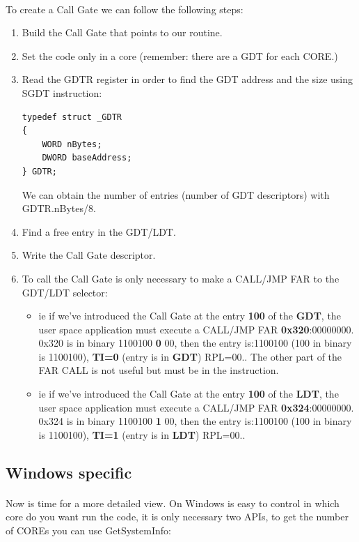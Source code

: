 \documentclass[12pt,a4paper,english]{book}
\newcommand{\paraph}{\paragraph{}}
\begin{document}
\paraph{}
To create a Call Gate we can follow the following steps:
\begin{enumerate}
\item {Build the Call Gate that points to our routine.}
\item {Set the code only in a core (remember: there are a GDT for each CORE.)}
\item {Read the GDTR register in order to find the GDT address and the size using SGDT instruction:

\lstset{language=C,caption=GDTR register}
\begin{lstlisting}
typedef struct _GDTR
{
    WORD nBytes;
    DWORD baseAddress;
} GDTR;
\end{lstlisting}

We can obtain the number of entries (number of GDT descriptors) with GDTR.nBytes/8.
}
\item {Find a free entry in the GDT/LDT.}
\item {Write the Call Gate descriptor.}
\item { To call the Call Gate is only necessary to make a CALL/JMP FAR to the GDT/LDT selector:
\begin{itemize}
\item { ie if we've introduced the Call Gate at the entry {\bf 100} of the {\bf GDT}, the user space application must execute a CALL/JMP FAR {\bf 0x320}:00000000. 0x320 is in binary 1100100 {\bf 0} 00, then the entry is:1100100 (100 in binary is 1100100), {\bf TI=0} (entry is in {\bf GDT}) RPL=00.. The other part of the FAR CALL is not useful but must be in the instruction.}
\item { ie if we've introduced the Call Gate at the entry {\bf 100} of the {\bf LDT}, the user space application must execute a CALL/JMP FAR {\bf 0x324}:00000000. 0x324 is in binary 1100100 {\bf 1} 00, then the entry is:1100100 (100 in binary is 1100100), {\bf TI=1} (entry is in {\bf LDT}) RPL=00..}
\end{itemize}
}

\end{enumerate}

\subsection{Windows specific}
\paraph{}
Now is time for a more detailed view. On Windows is easy to control in which core do you want run the code, it is only necessary two APIs, to get the number of COREs you can use GetSystemInfo:
\end{document}

